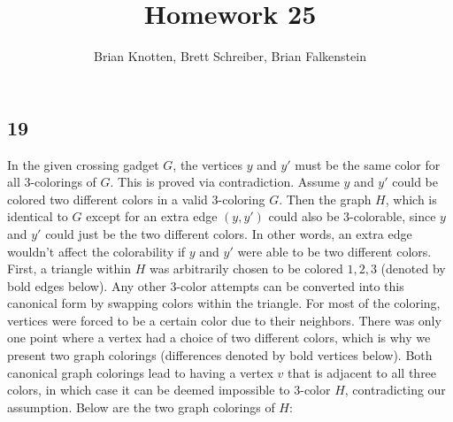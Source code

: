 \documentclass[letterpaper,notitlepage,twoside]{article}
\begin{document}
\title{Homework 25}
\author{Brian Knotten, Brett Schreiber, Brian Falkenstein}
\maketitle
\subsection*{19}
In the given crossing gadget $G$, the vertices $y$ and $y'$ must be the same color for all 3-colorings of $G$. This is proved via contradiction. Assume $y$ and $y'$ could be colored two different colors in a valid 3-coloring $G$. Then the graph $H$, which is identical to $G$ except for an extra edge $(y, y')$ could also be 3-colorable, since $y$ and $y'$ could just be the two different colors. In other words, an extra edge wouldn't affect the colorability if $y$ and $y'$ were able to be two different colors.
\\
First, a triangle within $H$ was arbitrarily chosen to be colored $1, 2, 3$ (denoted by bold edges below). Any other 3-color attempts can be converted into this canonical form by swapping colors within the triangle. For most of the coloring, vertices were forced to be a certain color due to their neighbors. There was only one point where a vertex had a choice of two different colors, which is why we present two graph colorings (differences denoted by bold vertices below). Both canonical graph colorings lead to having a vertex $v$ that is adjacent to all three colors, in which case it can be deemed impossible to 3-color $H$, contradicting our assumption. Below are the two graph colorings of $H$:
\\\\
\end{document}
